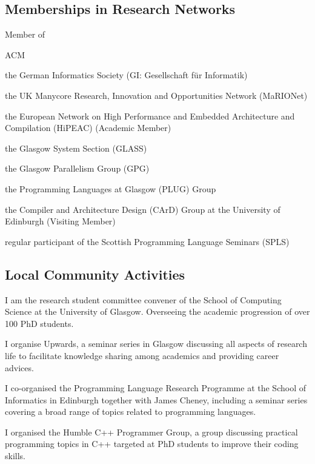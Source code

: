 \documentclass[11pt,a4paper]{moderncv}
\newcommand{\highlight}[1]{\textcolor{color1}{#1}}
\begin{document}
\subsection{Memberships in Research Networks}
\begin{cvitemize}
    \item Member of
      \begin{inlineItemize}
        \item \highlight{ACM}
        \item the German Informatics Society (\highlight{GI}\@: {\footnotesize Gesellschaft f{\"u}r Informatik})
        \item the UK Manycore Research, Innovation and Opportunities Network (\highlight{MaRIONet})
        \item the European Network on High Performance and Embedded Architecture and Compilation (\highlight{HiPEAC}) (Academic Member)
        \item the Glasgow System Section (\highlight{GLASS})
        \item the Glasgow Parallelism Group (\highlight{GPG})
        \item the Programming Languages at Glasgow (\highlight{PLUG}) Group
        \item the Compiler and Architecture Design (\highlight{CArD}) Group at the University of Edinburgh (Visiting Member)
        \item regular participant of the Scottish Programming Language Seminars (\highlight{SPLS})
      \end{inlineItemize}
\end{cvitemize}

\subsection{Local Community Activities}
\begin{cvitemize}
  \item I am the \highlight{research student committee convener} of the School of Computing Science at the University of Glasgow.
        Overseeing the academic progression of over 100 PhD students.
  \item I organise \highlight{Upwards}, a seminar series in Glasgow discussing all aspects of research life to facilitate knowledge sharing among academics and providing career advices.
  \item I co-organised the \highlight{Programming Language Research Programme} at the School of Informatics in Edinburgh together with James Cheney, including a seminar series covering a broad range of topics related to programming languages.
  \item I organised the \highlight{Humble C++ Programmer Group}, a group discussing practical programming topics in C++ targeted at PhD students to improve their coding skills.
\end{cvitemize}
\end{document}
